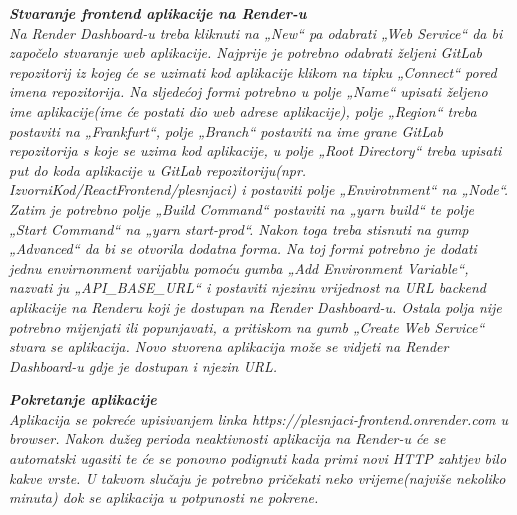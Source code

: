 	\newpage
	 \textbf{\textit{Stvaranje frontend aplikacije na Render-u}}\\
	\textit{Na Render Dashboard-u treba kliknuti na „New“ pa odabrati „Web Service“ da bi započelo stvaranje web aplikacije. Najprije je potrebno odabrati željeni GitLab repozitorij iz kojeg će se uzimati kod aplikacije klikom na tipku „Connect“ pored imena repozitorija. Na sljedećoj formi potrebno u polje „Name“ upisati željeno ime aplikacije(ime će postati dio web adrese aplikacije), polje „Region“ treba postaviti na „Frankfurt“, polje „Branch“ postaviti na ime grane GitLab repozitorija s koje se uzima kod aplikacije, u polje „Root Directory“ treba upisati put do koda aplikacije u GitLab repozitoriju(npr. IzvorniKod/ReactFrontend/plesnjaci) i postaviti polje „Envirotnment“ na „Node“. Zatim je potrebno polje „Build Command“ postaviti na „yarn build“ te polje „Start Command“ na „yarn start-prod“. Nakon toga treba stisnuti na gump „Advanced“ da bi se otvorila dodatna forma. Na toj formi potrebno je dodati jednu envirnonment varijablu pomoću gumba „Add Environment Variable“, nazvati ju „API\_BASE\_URL“ i postaviti njezinu vrijednost na URL backend aplikacije na Renderu koji je dostupan na Render Dashboard-u. Ostala polja nije potrebno mijenjati ili popunjavati, a pritiskom na gumb „Create Web Service“ stvara se aplikacija. Novo stvorena aplikacija može se vidjeti na Render Dashboard-u gdje je dostupan i njezin URL.}
	\bigskip
	
	 \textbf{\textit{Pokretanje aplikacije}}\\
	
	\textit{Aplikacija se pokreće upisivanjem linka https://plesnjaci-frontend.onrender.com u browser. Nakon dužeg perioda neaktivnosti aplikacija na Render-u će se automatski ugasiti te će se ponovno podignuti kada primi novi HTTP zahtjev bilo kakve vrste. U takvom slučaju je potrebno pričekati neko vrijeme(najviše nekoliko minuta) dok se aplikacija u potpunosti ne pokrene.}



    

 
	
		
		